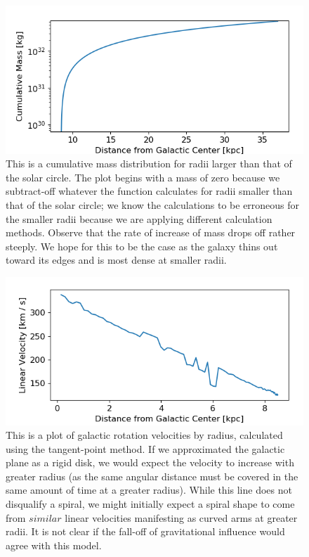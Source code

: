 \documentclass[12pt]{article}
\begin{document}
\begin{figure}
	\centering
	\includegraphics[width=.8\linewidth]{outer_mass_distro}
	\caption{This is a cumulative mass distribution for radii larger than that of the solar circle. The plot begins with a mass of zero because we subtract-off whatever the function calculates for radii smaller than that of the solar circle; we know the calculations to be erroneous for the smaller radii because we are applying different calculation methods. Observe that the rate of increase of mass drops off rather steeply. We hope for this to be the case as the galaxy thins out toward its edges and is most dense at smaller radii.}
	\label{fig:outer_mass_distro}
\end{figure}

\begin{figure}
	\centering
	\includegraphics[width=.8\linewidth]{inner_vel_distro}
	\caption{This is a plot of galactic rotation velocities by radius, calculated using the tangent-point method. If we approximated the galactic plane as a rigid disk, we would expect the velocity to increase with greater radius (as the same angular distance must be covered in the same amount of time at a greater radius). While this line does not disqualify a spiral, we might initially expect a spiral shape to come from $similar$ linear velocities manifesting as curved arms at greater radii. It is not clear if the fall-off of gravitational influence would agree with this model.}
	\label{fig:inner_vel_distro}
\end{figure}
\end{document}

